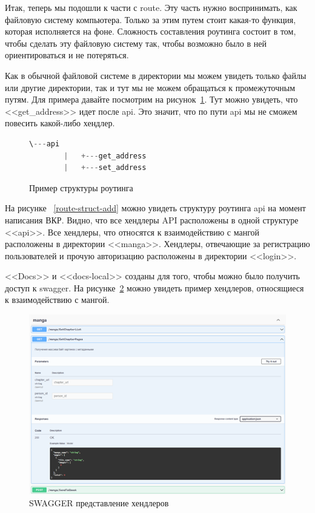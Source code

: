 Итак, теперь мы подошли к части с route. 
Эту часть нужно воспринимать, как файловую систему компьютера.
Только за этим путем стоит какая-то функция, которая исполняется на фоне.
Сложность составления роутинга состоит в том, чтобы сделать эту файловую систему так, чтобы возможно было в ней ориентироваться и не потеряться.

Как в обычной файловой системе в директории мы можем увидеть только файлы или другие директории, так и тут мы не можем обращаться к промежуточным путям.
Для примера давайте посмотрим на рисунок~\ref{route-struct}.
Тут можно увидеть, что <<get\_address>> идет после api. Это значит, что по пути api мы не сможем повесить какой-либо хендлер.

\begin{figure}
    \begin{lstlisting}[language=go]
        \---api
        |   +---get_address
        |   +---set_address
    \end{lstlisting}
    \caption{Пример структуры роутинга}
    \label{route-struct}
\end{figure}

На рисунке ~\ref{route-struct-add} можно увидеть структуру роутинга api на момент написания ВКР.
Видно, что все хендлеры API расположены в одной структуре <<api>>. 
Все хендлеры, что относятся к взаимодействию с мангой расположены в директории <<manga>>. 
Хендлеры, отвечающие за регистрацию пользователей и прочую авторизацию расположены в директории <<login>>. 

<<Docs>> и <<docs-local>> созданы для того, чтобы можно было получить доступ к swagger.
На рисунке~\ref{swagger-pic} можно увидеть пример хендлеров, относящиеся к взаимодействию с мангой.

\begin{figure}
    \includegraphics[scale=0.8]{imgs/swagger}
    \caption{SWAGGER представление хендлеров}
    \label{swagger-pic}
\end{figure}

